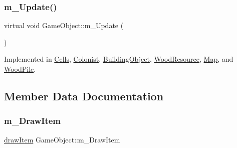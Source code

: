 \mbox{\label{class_game_object_a3af5a7b470e09f13a1422439fc6a9ba8}} 
\subsubsection{\texorpdfstring{m\+\_\+\+Update()}{m\_Update()}}
{\footnotesize\ttfamily virtual void Game\+Object\+::m\+\_\+\+Update (\begin{DoxyParamCaption}{ }\end{DoxyParamCaption})\hspace{0.3cm}{\ttfamily [pure virtual]}}



Implemented in \mbox{\hyperlink{class_cells_a524d410412de7030016b99a4d8b0c1cc}{Cells}}, \mbox{\hyperlink{class_colonist_ad51f196ece25322b1ab2a229875ac490}{Colonist}}, \mbox{\hyperlink{class_building_object_a35fc31e0f1c9a1323b7dfedc527fccff}{Building\+Object}}, \mbox{\hyperlink{class_wood_resource_a8ba1b597aacbdd74be37d0ab18d95008}{Wood\+Resource}}, \mbox{\hyperlink{class_map_a50d9a80e029be4f056b8c5d73791b6c4}{Map}}, and \mbox{\hyperlink{class_wood_pile_a008e8dc7b168ab4e0bcc946c240d0a32}{Wood\+Pile}}.



\subsection{Member Data Documentation}
\mbox{\label{class_game_object_a2e0b93a38fc8523e1be5790e647e6be3}} 
\subsubsection{\texorpdfstring{m\+\_\+\+Draw\+Item}{m\_DrawItem}}
{\footnotesize\ttfamily \mbox{\hyperlink{_game_object_8h_a9609a9a703d8f2cd54b9490ab5375b1f}{draw\+Item}} Game\+Object\+::m\+\_\+\+Draw\+Item\hspace{0.3cm}{\ttfamily [protected]}}

\mbox{\label{class_game_object_a8d07ca1aef7f289bb8cbdca91c0f3f82}} 
